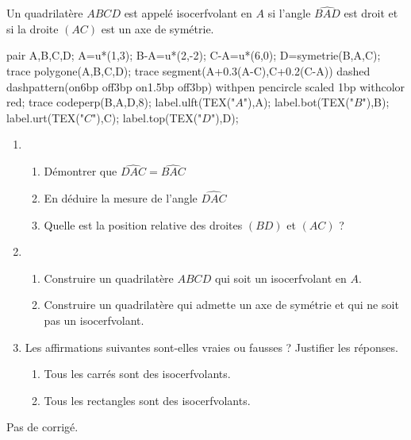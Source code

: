 \begin{exercice*}
   Un quadrilatère $ABCD$ est appelé isocerfvolant en $A$ si l'angle $\widehat{BAD}$ est droit et si la droite $(AC)$ est un axe de symétrie.
   \begin{center}
      \begin{Geometrie}
         pair A,B,C,D;
         A=u*(1,3);
         B-A=u*(2,-2);
         C-A=u*(6,0);
         D=symetrie(B,A,C);
         trace polygone(A,B,C,D);
         trace segment(A+0.3(A-C),C+0.2(C-A)) dashed dashpattern(on6bp off3bp on1.5bp off3bp) withpen pencircle scaled 1bp withcolor red;
         trace codeperp(B,A,D,8);
         label.ulft(TEX("$A$"),A);
         label.bot(TEX("$B$"),B);
         label.urt(TEX("$C$"),C);
         label.top(TEX("$D$"),D);
      \end{Geometrie}
   \end{center}
\begin{enumerate}
   \item
   \begin{enumerate}
      \item Démontrer que $\widehat{DAC} =\widehat{BAC}$
      \item En déduire la mesure de l'angle $\widehat{DAC}$
      \item Quelle est la position relative des droites $(BD)$ et $(AC)$ ?
   \end{enumerate}
   \item
   \begin{enumerate}
      \item Construire un quadrilatère $ABCD$ qui soit un isocerfvolant en $A$.
      \item Construire un quadrilatère qui admette un axe de symétrie et qui ne soit pas un isocerfvolant.
   \end{enumerate}
   \item Les affirmations suivantes sont-elles vraies ou fausses ? Justifier les réponses.
   \begin{enumerate}
      \item Tous les carrés sont des isocerfvolants.
      \item Tous les rectangles sont des isocerfvolants.
   \end{enumerate}
\end{enumerate}
\end{exercice*}
\begin{corrige}
   Pas de corrigé.
\end{corrige}
